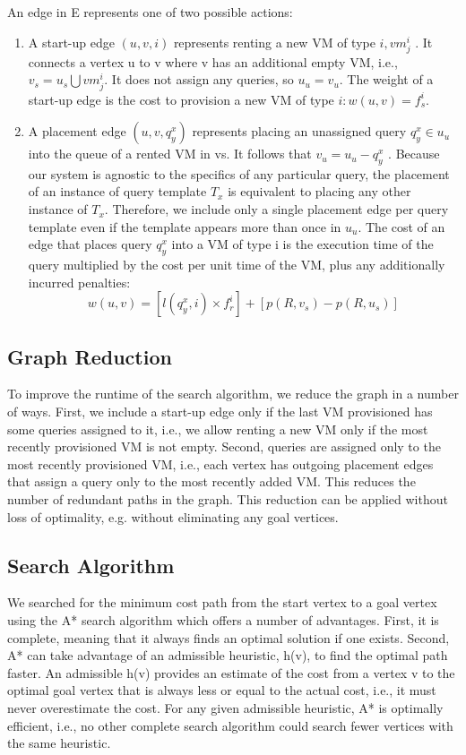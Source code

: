 An edge in E represents one of two possible actions:
\begin{enumerate}
\item A start-up edge \((u, v, i)\) represents renting a new VM of type \(i, vm^i_j\) . It connects a vertex u to v where v has an additional empty VM, i.e., \(v_s = u_s \bigcup vm^i_j\). It does not assign any queries, so \(u_u = v_u\). The weight of a start-up edge is the cost to provision a new VM of type \(i: w(u, v) = f^i_s\). 

\item A placement edge \((u, v, q^x_y)\) represents placing an unassigned query \(q^x_y \in u_u\) into the queue of a rented VM in vs. It follows that \(v_u = u_u-q^x_y\) . Because our system is agnostic to the specifics of any particular query, the placement of an instance of query template \(T_x\) is equivalent to placing any other instance of \(T_x\). Therefore, we include only a single placement edge per query template even if the template appears more than once in \(u_u\). The cost of an edge that places query \(q^x_y\) into a VM of type i is the execution time of the query multiplied by the cost per unit time of the VM, plus any additionally incurred penalties:
\begin{equation} \label{penalty}
w(u, v) = [l(q^x_y, i)\times f^i_r ]+[p(R, v_s) - p(R, u_s)]
\end{equation}
\end{enumerate}
\subsection{Graph Reduction}
To improve the runtime of the search algorithm, we reduce the graph in a number of ways. First, we include a start-up edge only if the last VM provisioned has some queries assigned to it, i.e., we allow renting a new VM only if the most recently provisioned VM is not empty. Second, queries are assigned only to the most recently provisioned VM, i.e., each vertex has outgoing placement edges that assign a query only to the most recently added VM. This reduces the number of redundant paths in the graph. This reduction can be applied without loss of optimality, e.g. without eliminating any goal vertices.
\subsection{Search Algorithm}
We searched for the minimum cost path from the start vertex to a goal vertex using the A* search algorithm \cite{hart1968formal} which offers a number of advantages. First, it is complete, meaning that it always finds an optimal solution if one exists. Second, A* \cite{hart1968formal} can take advantage of an admissible heuristic, h(v), to find the optimal path faster. An admissible h(v) provides an estimate of the cost from a vertex v to the optimal goal vertex that is always less or equal to the actual cost, i.e., it must never overestimate the cost. For any given admissible heuristic, A* \cite{hart1968formal} is optimally efficient, i.e., no other complete search algorithm could search fewer vertices with the same heuristic. 
